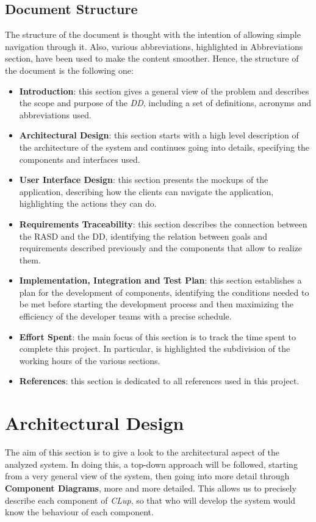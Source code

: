 \documentclass{article}
\begin{document}
	\subsection{Document Structure}
		The structure of the document is thought with the intention of allowing simple navigation through it. Also, various abbreviations, highlighted in Abbreviations section, have been used to make the content smoother.
		Hence, the structure of the document is the following one:
		\begin{itemize}
			\item {\bfseries Introduction}: this section gives a general view of the problem and describes the scope and purpose of the \emph{DD}, including a set of definitions, acronyms and abbreviations used.
			
			\item {\bfseries Architectural Design}: this section starts with a high level description of the architecture of the system and continues going into details, specifying the components and interfaces used.
			
			\item {\bfseries User Interface Design}: this section presents the mockups of the application, describing how the clients can navigate the application, highlighting the actions they can do.
			
			\item {\bfseries Requirements Traceability}: this section describes the connection between the RASD and the DD, identifying the relation between goals and requirements described previously and the components that allow to realize them.
			
			\item {\bfseries Implementation, Integration and Test Plan}: this section establishes a plan for the development of components, identifying the conditions needed to be met before starting the development process and then maximizing the efficiency of the developer teams with a precise schedule.
			
			\item {\bfseries Effort Spent}: the main focus of this section is to track the time spent to complete this project. In particular, is highlighted the subdivision of the working hours of the various sections.
			
			\item {\bfseries References}: this section is dedicated to all references used in this project.
		\end{itemize}
	\newpage
\section{Architectural Design}
	The aim of this section is to give a look to the architectural aspect of the analyzed system. In doing this, a top-down approach will be followed, starting from a very general view of the system, then going into more detail through {\bfseries Component Diagrams}, more and more detailed. This allows us to precisely describe each component of \emph{CLup}, so that who will develop the system would know the behaviour of each component.
	
\end{document}
